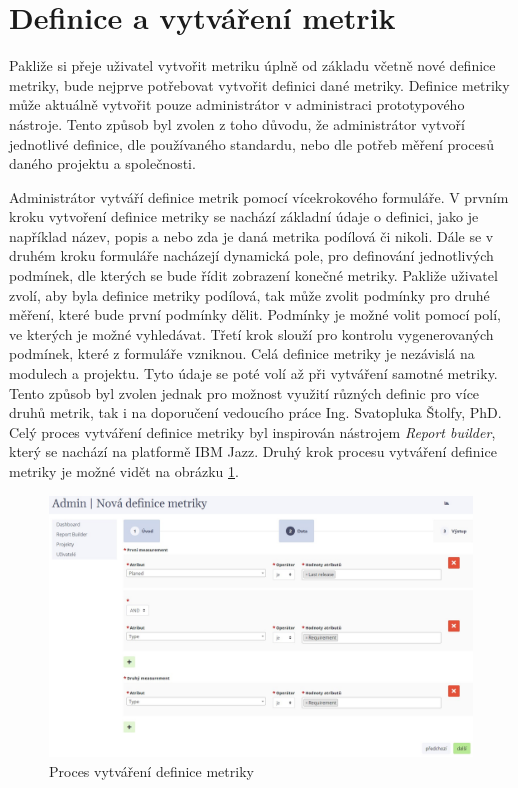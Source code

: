 \documentclass[czech,master]{diploma}
\begin{document}

\section{Definice a vytváření metrik}
Pakliže si přeje uživatel vytvořit metriku úplně od základu včetně nové definice metriky, bude nejprve potřebovat vytvořit definici dané metriky. Definice metriky může aktuálně vytvořit pouze administrátor v administraci prototypového nástroje. Tento způsob byl zvolen z toho důvodu, že administrátor vytvoří jednotlivé definice, dle používaného standardu, nebo dle potřeb měření procesů daného projektu a společnosti.

Administrátor vytváří definice metrik pomocí vícekrokového formuláře. V prvním kroku vytvoření definice metriky se nachází základní údaje o definici, jako je například název, popis a nebo zda je daná metrika podílová či nikoli. Dále se v druhém kroku formuláře nacházejí dynamická pole, pro definování jednotlivých podmínek, dle kterých se bude řídit zobrazení konečné metriky. Pakliže uživatel zvolí, aby byla definice metriky podílová, tak může zvolit podmínky pro druhé měření, které bude první podmínky dělit. Podmínky je možné volit pomocí polí, ve kterých je možné vyhledávat. Třetí krok slouží pro kontrolu vygenerovaných podmínek, které z formuláře vzniknou. Celá definice metriky je nezávislá na modulech a projektu. Tyto údaje se poté volí až při vytváření samotné metriky. Tento způsob byl zvolen jednak pro možnost využití různých definic pro více druhů metrik, tak i na doporučení vedoucího práce Ing. Svatopluka Štolfy, PhD. Celý proces vytváření definice metriky byl inspirován nástrojem \textit{Report builder}, který se nachází na platformě IBM Jazz. Druhý krok procesu vytváření definice metriky je možné vidět na obrázku \ref{fig:report_builder_admin}.

\begin{figure}[!ht]
    \centering
    \includegraphics[width=1\textwidth]{Diplomka/Figures/report_builder.jpg}
    \caption{Proces vytváření definice metriky}
    \label{fig:report_builder_admin}
\end{figure}
\end{document}
